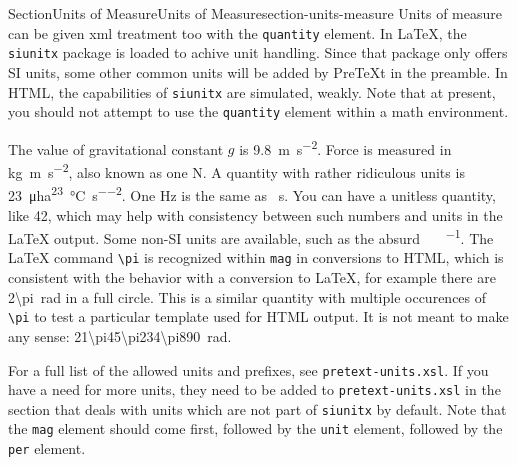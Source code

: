 \documentclass[twoside,10pt,]{article}
\newcommand{\mono}[1]{\texttt{#1}}
\numberwithin{equation}{section}
\begin{document}
%
%
\typeout{************************************************}
\typeout{************************************************}
%
\begin{sectionptx}{Section}{Units of Measure}{}{Units of Measure}{}{}{section-units-measure}
Units of measure can be given xml treatment too with the \mono{quantity} element. In \LaTeX{}, the \mono{siunitx} package is loaded to achive unit handling. Since that package only offers SI units, some other common units will be added by PreTeXt in the preamble. In HTML, the capabilities of \mono{siunitx} are simulated, weakly. Note that at present, you should not attempt to use the \mono{quantity} element within a math environment.%
\par
The value of gravitational constant \(g\) is \SI{9.8}{\meter\per\second\tothe{2}}. Force is measured in \si{\kilo\gram\meter\per\second\tothe{2}}, also known as one \si{\newton}. A quantity with rather ridiculous units is \SI{23}{\micro\hectare\tothe{23}\per\degreeCelsius\per\second\tothe{2}}. One \si{\hertz} is the same as \si{\per\second}. You can have a unitless quantity, like \num{42}, which may help with consistency between such numbers and units in the \LaTeX{} output. Some non-SI units are available, such as the absurd \si{\degreeFahrenheit\foot\pound\per\gallon}.  The \LaTeX{} command \mono{\textbackslash{}pi} is recognized within \mono{mag} in conversions to HTML, which is consistent with the behavior with a conversion to \LaTeX{}, for example there are \SI{2\pi}{\radian} in a full circle.  This is a similar quantity with multiple occurences of \mono{\textbackslash{}pi} to test a particular template used for HTML output.  It is not meant to make any sense: \SI{21\pi45\pi234\pi890}{\radian}.%
\par
For a full list of the allowed units and prefixes, see \mono{pretext-units.xsl}. If you have a need for more units, they need to be added to \mono{pretext-units.xsl} in the section that deals with units which are not part of \mono{siunitx} by default.  Note that the \mono{mag} element should come first, followed by the \mono{unit} element, followed by the \mono{per} element.%
\end{sectionptx}
%
%
\typeout{************************************************}
\typeout{************************************************}
%
\end{document}
